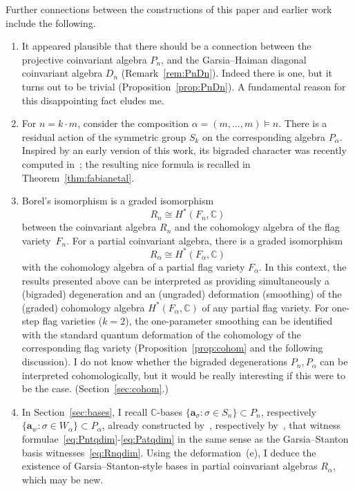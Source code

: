 \documentclass[a4paper,11pt]{amsart}
\theoremstyle{plain}
\theoremstyle{definition}
\newcommand{\C}{\mathbb{C}}
\begin{document}
Further connections between the constructions of this paper and earlier work include the following. 
\begin{enumerate}
\item[(f)]  It appeared plausible that there should be a connection between the projective coinvariant algebra $P_n$, 
and the Garsia--Haiman diagonal coinvariant algebra $D_n$ (Remark~\ref{rem:PnDn}). Indeed there is one, but it turns out 
to be trivial (Proposition~\ref{prop:PnDn}). A fundamental reason for this disappointing fact eludes me. 
\item[(g)] For $n=k\cdot m$, consider the composition $\alpha=(m,\ldots, m)\vDash n$. There is a residual action
of the symmetric group $S_k$ on the corresponding algebra $P_\alpha$. Inspired by an early version of this work, its bigraded character was recently computed in~\cite{LR}; the resulting nice formula is recalled in Theorem~\ref{thm:fabianetal}. 
\item[(h)] Borel's isomorphism is a graded isomorphism 
\[
R_n \cong H^*(F_n, \C)
\]
between the coinvariant algebra $R_n$ and the cohomology algebra
of the flag variety~$F_n$. For a partial coinvariant algebra, there is a graded isomorphism
\[R_\alpha \cong H^*(F_\alpha, \C)\]
with the cohomology algebra of a partial flag variety $F_\alpha$. In this context, the results presented above can be interpreted as providing simultaneously a (bigraded) degeneration and an (ungraded) deformation (smoothing) of the (graded) cohomology algebra $H^*(F_\alpha, \C)$ of any partial flag variety. 
For one-step flag varieties ($k=2$), the one-parameter smoothing can be identified with the standard quantum deformation of the cohomology of the corresponding flag variety (Proposition~\ref{prop:cohom} and the following discussion).  
I do not know whether the bigraded degenerations $P_n, P_\alpha$ can be interpreted cohomologically, but it would be really interesting if this were to be the case. (Section~\ref{sec:cohom}.) 
\item[(i)] In Section~\ref{sec:bases}, I recall $\C$-bases $\{\mathbf{a}_\sigma\colon\sigma\in S_n\}\subset P_n$, respectively 
$\{\mathbf{a}_w\colon\sigma\in W_\alpha\}\subset P_\alpha$, already constructed by~\cite{BO}, respectively by~\cite{RSW}, that witness formulae~\eqref{eq:Pntqdim}-\eqref{eq:Patqdim} in the same sense as the Garsia--Stanton basis witnesses~\eqref{eq:Rnqdim}. Using the deformation~(e), I deduce the existence of Garsia--Stanton-style bases in partial coinvariant algebras $R_\alpha$, which may be new. 
\end{enumerate}
\end{document}

